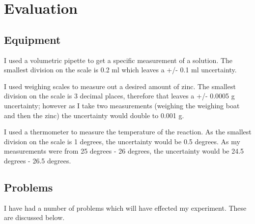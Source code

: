 \chapter {Evaluation}

\section{Equipment}

I used a volumetric pipette to get a specific measurement of a solution. The smallest division on the scale is 0.2 ml which leaves a +/- 0.1 ml uncertainty. 

I used weighing scales to measure out a desired amount of zinc. The smallest division on the scale is 3 decimal places, therefore that leaves a +/- 0.0005 g uncertainty; however as I take two measurements (weighing the weighing boat and then the zinc) the uncertainty would double to 0.001 g.

I used a thermometer to measure the temperature of the reaction. As the smallest division on the scale is 1 degrees, the uncertainty would be 0.5 degrees. As my measurements were from 25 degrees - 26 degrees, the uncertainty would be 24.5 degrees - 26.5 degrees.

\section{Problems}

I have had a number of problems which will have effected my experiment. These are discussed below.

